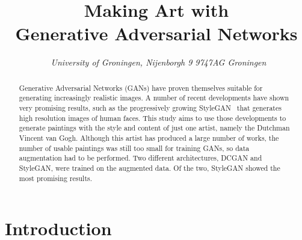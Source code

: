 \documentclass{article}
\title{\textbf{\huge Making Art with\\Generative Adversarial Networks}}
\author{Loran Knol (s3182541)\affila \and Thijs Havinga (s2922924)\affila \and Elisa Oostwal (s2468255) \affila \and Jeroen Overschie (s2995697) \affila \and}
\date{\affila\ \textit{University of Groningen, Nijenborgh 9 9747AG Groningen}}
\begin{document}
\ttl
\thispagestyle{empty}

\begin{abstract}
\noindent
Generative Adversarial Networks (GANs) have proven themselves suitable for generating increasingly realistic images. A number of recent developments have shown very promising results, such as the progressively growing StyleGAN~\cite{karras2019stylebased} that generates high resolution images of human faces. This study aims to use those developments to generate paintings with the style and content of just one artist, namely the Dutchman Vincent van Gogh. Although this artist has produced a large number of works, the number of usable paintings was still too small for training GANs, so data augmentation had to be performed. Two different architectures, DCGAN and StyleGAN, were trained on the augmented data. Of the two, StyleGAN showed the most promising results.
\end{abstract}


% 






\section{Introduction}
\end{document}
